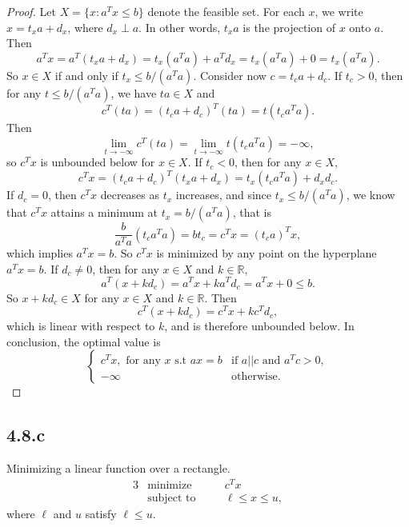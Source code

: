 \documentclass[12pt]{article}
\newcommand{\R}{\mathbb{R}}
\begin{document}
\begin{proof}
    Let $X = \{x : a^Tx\leq b\}$ denote the feasible set. For each $x$, we write $x=t_xa + d_x$, where $d_x\perp a$. In other words, $t_xa$ is the projection of $x$ onto $a$. Then
    \[a^Tx = a^T(t_xa + d_x) = t_x(a^Ta) + a^Td_x = t_x(a^Ta) + 0 = t_x(a^Ta).\]
    So $x\in X$ if and only if $t_x\leq b/(a^Ta)$. Consider now $c=t_ca+d_c$. If $t_c>0$, then for any $t\leq b/(a^Ta)$, we have $ta\in X$ and
    \[c^T(ta) = (t_ca + d_c)^T(ta) = t(t_ca^Ta).\]
    Then
    \[\lim_{t\to-\infty}c^T(ta) = \lim_{t\to-\infty}t(t_ca^Ta) = -\infty,\]
    so $c^Tx$ is unbounded below for $x\in X$. If $t_c<0$, then for any $x\in X$,
    \[c^Tx = (t_ca + d_c)^T(t_xa+d_x) = t_x(t_ca^Ta) + d_xd_c.\]
    If $d_c=0$, then $c^Tx$ decreases as $t_x$ increases, and since $t_x\leq b/(a^Ta)$, we know that $c^Tx$ attains a minimum at $t_x=b/(a^Ta)$, that is
    \[\frac{b}{a^Ta}(t_ca^Ta) = bt_c = c^Tx = (t_ca)^Tx,\]
    which implies $a^Tx=b$. So $c^Tx$ is minimized by any point on the hyperplane $a^Tx=b$. If $d_c\ne0$, then for any $x\in X$ and $k\in\R$,
    \[a^T(x+kd_c) = a^Tx + ka^Td_c = a^Tx + 0 \leq b.\]
    So $x+kd_c\in X$ for any $x\in X$ and $k\in\R$. Then
    \[c^T(x+kd_c) = c^Tx + kc^Td_c,\]
    which is linear with respect to $k$, and is therefore unbounded below. In conclusion, the optimal value is
    \[\begin{cases}
        c^Tx, \text{ for any } x \text{ s.t } ax=b &\text{if } a||c \text{ and } a^Tc>0, \\
        -\infty &\text{otherwise.}
    \end{cases}\]
    
\end{proof}

\subsection*{4.8.c}
Minimizing a linear function over a rectangle.
\begin{alignat*}{3}
    &\text{minimize}    &\quad& c^Tx \\
    &\text{subject to}  &\quad& \ell \leq x \leq u,
\end{alignat*}
where $\ell$ and $u$ satisfy $\ell\leq u$.
\end{document}

